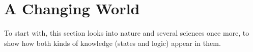 %
%
%
%
%
%
%

\section{A Changing World}
\label{a_changing_world_heading}

To start with, this section looks into nature and several sciences once more,
to show how both kinds of knowledge (states and logic) appear in them.






%
%
%
